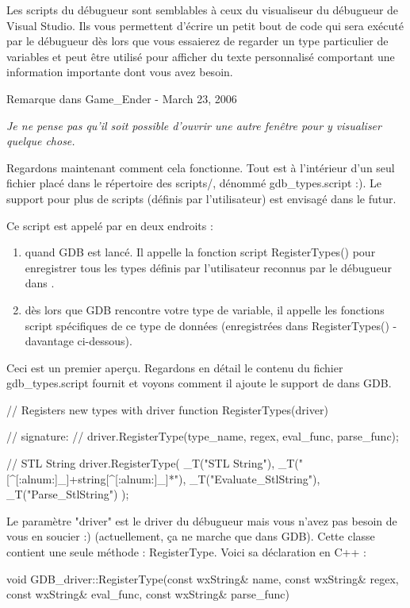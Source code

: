 Les scripts du débugueur sont semblables à ceux du visualiseur du débugueur de Visual Studio. Ils vous permettent d'écrire un petit bout de code qui sera exécuté par le débugueur dès lors que vous essaierez de regarder un type particulier de variables et peut être utilisé pour afficher du texte personnalisé comportant une information importante dont vous avez besoin.

Remarque dans Game\_Ender - March 23, 2006

\textit{Je ne pense pas qu'il soit possible d'ouvrir une autre fenêtre pour y visualiser quelque chose.}

Regardons maintenant comment cela fonctionne. Tout est à l'intérieur d'un seul fichier placé dans le répertoire des scripts/, dénommé gdb\_types.script :). Le support pour plus de scripts (définis par l'utilisateur) est envisagé dans le futur.


Ce script est appelé par \codeblocks en deux endroits :
\begin{enumerate}
\item quand GDB est lancé. Il appelle la fonction script RegisterTypes() pour enregistrer tous les types définis par l'utilisateur reconnus par le débugueur dans \codeblocks.
\item dès lors que GDB rencontre votre type de variable, il appelle les fonctions script spécifiques de ce type de données (enregistrées dans RegisterTypes() - davantage ci-dessous).
\end{enumerate}

Ceci est un premier aperçu. Regardons en détail le contenu du fichier gdb\_types.script fournit et voyons comment il ajoute le support de  dans GDB.

\begin{code}
// Registers new types with driver
function RegisterTypes(driver)
{
//    signature:
//    driver.RegisterType(type_name, regex, eval_func, parse_func); 

    // STL String
    driver.RegisterType(
        _T("STL String"),
        _T("[^[:alnum:]_]+string[^[:alnum:]_]*"),
        _T("Evaluate_StlString"),
        _T("Parse_StlString")
    );
}
\end{code}

Le paramètre "driver" est le driver du débugueur mais vous n'avez pas besoin de vous en soucier :) (actuellement, ça ne marche que dans GDB). Cette classe contient une seule méthode : RegisterType. Voici sa déclaration en C++ :

\begin{code}
void GDB_driver::RegisterType(const wxString& name, const wxString& regex, 
                      const wxString& eval_func, const wxString& parse_func)
\end{code}

